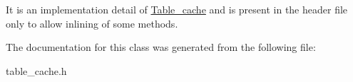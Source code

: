 It is an implementation detail of \mbox{\hyperlink{classTable__cache}{Table\+\_\+cache}} and is present in the header file only to allow inlining of some methods. 

The documentation for this class was generated from the following file\+:\begin{DoxyCompactItemize}
\item 
table\+\_\+cache.\+h\end{DoxyCompactItemize}
